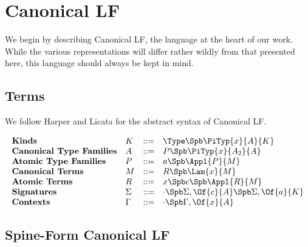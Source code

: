 

\section{Canonical LF}
We begin by describing Canonical LF, the language at the
heart of our work.  While the various representations will
differ rather wildly from that presented here, this language
should always be kept in mind.

\subsection{Terms}\label{CLF:types}  
  We follow Harper and Licata \cite{HarperLicataCLF} for the
abstract syntax of Canonical LF. 

$$
\begin{array}{llll}
\textbf{Kinds} & K & ::= & \Type \Spb \PiTyp{x}{A}{K} \\
\textbf{Canonical Type Families} & A & ::= & P \Spb \PiTyp{x}{A_2}{A} \\
\textbf{Atomic Type Families} & P & ::= & a \Spb \Appl{P}{M} \\
\textbf{Canonical Terms} & M & ::= & R \Spb \Lam{x}{M} \\
\textbf{Atomic Terms} & R & ::= &  x \Spb c \Spb \Appl{R}{M}\\
\textbf{Signatures} & \Sigma & ::= & \cdot \Spb \Sigma,\Of{c}{A} 
\Spb \Sigma,\Of{a}{K}\\
\textbf{Contexts} & \Gamma & ::= & \cdot \Spb \Gamma,\Of{x}{A}\\
\end{array}
$$


\subsection{Spine-Form Canonical LF}

